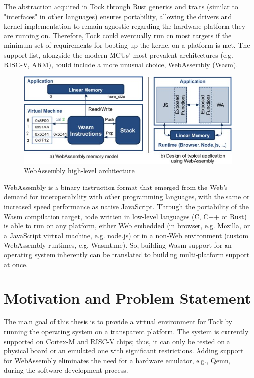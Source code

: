 \documentclass[12pt,a4paper]{report}
\begin{document}
The abstraction acquired in Tock through Rust generics and traits (similar to "interfaces"
in other languages) ensures portability, allowing the drivers and kernel implementation to
remain agnostic regarding the hardware platform they are running on. Therefore, Tock could
eventually run on most targets if the minimum set of requirements for booting up the
kernel on a platform is met. The support list, alongside the modern MCUs' most prevalent
architectures (e.g. RISC-V, ARM), could include a more unusual choice, WebAssembly
(Wasm).

\begin{figure}[H]
\centering
\includegraphics[scale=1.65]{pics/WebAssembly-high-level-architecture_W640-2.jpg}
  \caption[WebAssembly high-level architecture]{WebAssembly high-level architecture}
  \label{fig:wasm}
\end{figure}

WebAssembly is a binary instruction format that emerged from the Web's demand for interoperability with other programming languages, with the same or increased speed performance as native JavaScript. Through the portability of the Wasm compilation target, code written in low-level languages (C, C++ or Rust) is able to run on any platform, either Web embedded (in browser, e.g. Mozilla, or a JavaScript virtual machine, e.g. node.js) or in a non-Web environment (custom WebAssembly runtimes, e.g. Wasmtime). So, building Wasm support for an operating system inherently can be translated to building multi-platform support at once.


\section{Motivation and Problem Statement} 

The main goal of this thesis is to provide a virtual environment for Tock by running the operating system on a transparent platform. The system is currently supported on Cortex-M and RISC-V chips; thus, it can only be tested on a physical board or an emulated one with significant restrictions. Adding support for WebAssembly eliminates the need for a hardware emulator, e.g., Qemu, during the software development process.
\end{document}
